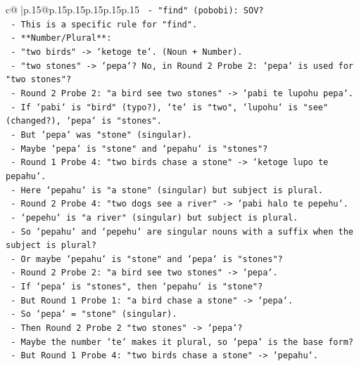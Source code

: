 \documentclass{article}
\begin{document}
{\begin{supertabular}{c@{$\;$}|p{.15\linewidth}@{}p{.15\linewidth}p{.15\linewidth}p{.15\linewidth}p{.15\linewidth}p{.15\linewidth}}
{{{\texttt{          {-} "find" (pobobi): SOV?} \\
\texttt{          {-} This is a specific rule for "find".} \\
\texttt{      {-} **Number/Plural**:} \\
\texttt{        {-} "two birds" {-}> `ketoge te`. (Noun + Number).} \\
\texttt{        {-} "two stones" {-}> `pepa`? No, in Round 2 Probe 2: `pepa` is used for "two stones"?} \\
\texttt{        {-} Round 2 Probe 2: "a bird see two stones" {-}> `pabi te lupohu pepa`.} \\
\texttt{        {-} If `pabi` is "bird" (typo?), `te` is "two", `lupohu` is "see" (changed?), `pepa` is "stones".} \\
\texttt{        {-} But `pepa` was "stone" (singular).} \\
\texttt{        {-} Maybe `pepa` is "stone" and `pepahu` is "stones"?} \\
\texttt{        {-} Round 1 Probe 4: "two birds chase a stone" {-}> `ketoge lupo te pepahu`.} \\
\texttt{        {-} Here `pepahu` is "a stone" (singular) but subject is plural.} \\
\texttt{        {-} Round 2 Probe 4: "two dogs see a river" {-}> `pabi halo te pepehu`.} \\
\texttt{        {-} `pepehu` is "a river" (singular) but subject is plural.} \\
\texttt{        {-} So `pepahu` and `pepehu` are singular nouns with a suffix when the subject is plural?} \\
\texttt{        {-} Or maybe `pepahu` is "stone" and `pepa` is "stones"?} \\
\texttt{        {-} Round 2 Probe 2: "a bird see two stones" {-}> `pepa`.} \\
\texttt{        {-} If `pepa` is "stones", then `pepahu` is "stone"?} \\
\texttt{        {-} But Round 1 Probe 1: "a bird chase a stone" {-}> `pepa`.} \\
\texttt{        {-} So `pepa` = "stone" (singular).} \\
\texttt{        {-} Then Round 2 Probe 2 "two stones" {-}> `pepa`?} \\
\texttt{        {-} Maybe the number `te` makes it plural, so `pepa` is the base form?} \\
\texttt{        {-} But Round 1 Probe 4: "two birds chase a stone" {-}> `pepahu`.} \\
}}}
\end{supertabular}}
\end{document}
